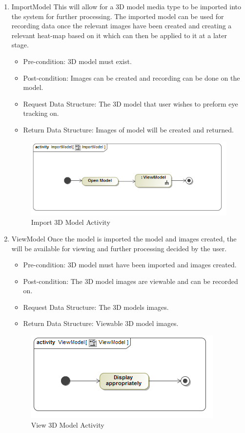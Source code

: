 	\begin{enumerate}
		\item{ImportModel}
		\newline
		This will allow for a 3D model media type to be imported into the system for further processing. The imported model can be used for recording data once the relevant images have been created and creating a relevant heat-map based on it which can then be applied to it at a later stage.
		\begin{itemize}
			\item Pre-condition: 3D model must exist.
			\item Post-condition: Images can be created and recording can be done on the model.
			\item Request Data Structure: The 3D model that user wishes to preform eye tracking on.
			\item Return Data Structure: Images of model will be created and returned.
		\end{itemize}
		
		\begin{figure}[!ht]
			\centering
			\includegraphics[scale=0.5]{Diagrams/Activity_Diagram__ImportModel__ImportModel.png}
			\caption{Import 3D Model Activity}
		\end{figure}
	
		\item{ViewModel}
		Once the model is imported the model and images created, the will be available for viewing and further processing decided by the user.
		\begin{itemize}
			\item Pre-condition: 3D model must have been imported and images created.
			\item Post-condition: The 3D model images are viewable and can be recorded on.
			\item Request Data Structure: The 3D models images.
			\item Return Data Structure: Viewable 3D model images.
		\end{itemize}
		\begin{figure}[!ht]
			\centering
			\includegraphics[scale=0.5]{Diagrams/Activity_Diagram__ViewModel__ViewModel.png}
		\caption{View 3D Model Activity}
		\end{figure}
		

\end{enumerate}
